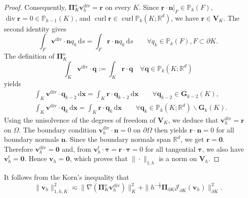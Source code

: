 \documentclass[review,hidelinks,onefignum,onetabnum]{siamart251216}
\begin{document}
\begin{proof}
Consequently, \(\boldsymbol{\Pi}_K^o \boldsymbol{v}_h^{\operatorname{div}}=\boldsymbol{r}\) on every \(K\). 
Since \(\boldsymbol{r}\cdot\boldsymbol{n}|_F\in \mathbb{P}_k(F)\), \(\operatorname{div}\boldsymbol{r}=0\in \mathbb{P}_{k-1}(K)\), and \(\operatorname{curl}\boldsymbol{r}\in \operatorname{curl}\mathbb{P}_k(K;\mathbb{R}^d)\), we have \(\boldsymbol{r}\in \boldsymbol{V}_K\).
The second identity gives
\[
\int_F \boldsymbol{v}^{\operatorname{div}} \cdot \boldsymbol{n} q_k \, \mathrm{d}s = \int_F \boldsymbol{r} \cdot \boldsymbol{n} q_k \, \mathrm{d}s
 \qquad \forall q_k \in \mathbb{P}_k(F), F \subset \partial K.
\]
The definition of $\boldsymbol{\Pi}_K^o$
\[
\int_K  \boldsymbol{v}^{\operatorname{div}} \cdot \boldsymbol{q} := \int_K \boldsymbol{r} \cdot \boldsymbol{q} \quad \forall \boldsymbol{q} \in \mathbb{P}_k(K;\mathbb{R}^d)
\]
yields
\begin{align*}
& \int_K \boldsymbol{v}^{\operatorname{div}} \cdot \boldsymbol{q}_{k-2} \, \mathrm{d}\boldsymbol{x} = \int_K \boldsymbol{r} \cdot \boldsymbol{q}_{k-2} \, \mathrm{d}\boldsymbol{x}
\qquad \forall \boldsymbol{q}_{k-2} \in \mathbf{G}_{k-2}(K), \\
& \int_K \boldsymbol{v}^{\operatorname{div}} \cdot \boldsymbol{q}_k \, \mathrm{d}\boldsymbol{x} =\int_K \boldsymbol{r} \cdot \boldsymbol{q}_k \, \mathrm{d}\boldsymbol{x} 
\qquad \forall \boldsymbol{q}_k \in \mathbb{P}_k(K;\mathbb{R}^d) \backslash \mathbf{G}_k(K).
\end{align*}
Using the unisolvence of the degrees of freedom of \(\boldsymbol{V}_K\), we deduce that \(\boldsymbol{v}_h^{\operatorname{div}}=\boldsymbol{r}\) on \(\Omega\).
 The boundary condition \(\boldsymbol{v}_h^{\operatorname{div}}\cdot\boldsymbol{n}=0\) on \(\partial\Omega\) then yields \(\boldsymbol{r}\cdot\boldsymbol{n}=0\) for all boundary normals \(\boldsymbol{n}\). Since the boundary normals span \(\mathbb{R}^d\), we get \(\boldsymbol{r}=\boldsymbol{0}\). Therefore \(\boldsymbol{v}_h^{\operatorname{div}}=\boldsymbol{0}\) and, from \(\boldsymbol{v}_h^t\cdot\boldsymbol{\tau}=\boldsymbol{r}\cdot\boldsymbol{\tau}=0\) for all tangential \(\boldsymbol{\tau}\), we also have \(\boldsymbol{v}_h^t=\boldsymbol{0}\). Hence \(\boldsymbol{v}_h=\boldsymbol{0}\), which proves that \(\|\cdot\|_{1,h}\) is a norm on \(\boldsymbol{V}_h\).
\end{proof}

It follows from the Korn's inequality that
\[
\|\boldsymbol{v}_h\|_{1,h,K}^2 \eqsim \|\nabla (\boldsymbol{\Pi}_K^o \boldsymbol{v}_h^{\operatorname{div}})\|_K^2 + \|h^{-\frac{1}{2}}  \boldsymbol{\Pi}_{\partial K}\mathcal{J}_{\partial K}(\boldsymbol{v}_h)\|_{\partial K}^2.
\]
\end{document}

